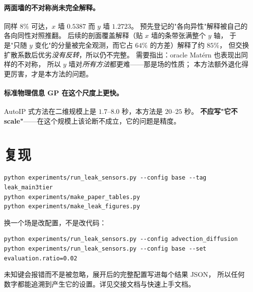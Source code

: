 \documentclass[11pt,a4paper]{article}
\begin{document}
\paragraph{两面墙的不对称尚未完全解释。}
同样 $8\%$ 可达，$x$ 墙 $0.5387$ 而 $y$ 墙 $1.2723$。
预先登记的"各向异性"解释被自己的各向同性对照推翻。
后续的剖面覆盖解释（贴 $x$ 墙的条带张满整个 $y$ 轴，
于是"只随 $y$ 变化"的分量被完全观测，而它占 $64\%$ 的方差）解释了约 $85\%$，
但交换扩散系数后优劣\emph{没有反转}，所以仍不完整。
需要指出：oracle Matérn 也表现出同样的不对称，
所以 $y$ 墙对\emph{所有方法}都更难——那是场的性质；
本方法额外退化得更厉害，才是本方法的问题。

\paragraph{标准物理信息 GP 在这个尺度上更快。}
AutoIP 式方法在二维规模上是 $1.7$--$8.0$ 秒，本方法是 $20$--$25$ 秒。
\textbf{不应写"它不 scale"}——在这个规模上该论断不成立，它的问题是精度。

\section{复现}

\begin{verbatim}
python experiments/run_leak_sensors.py --config base --tag leak_main3tier
python experiments/make_paper_tables.py
python experiments/make_leak_figures.py
\end{verbatim}

换一个场是改配置，不是改代码：

\begin{verbatim}
python experiments/run_leak_sensors.py --config advection_diffusion
python experiments/run_leak_sensors.py --config base --set evaluation.ratio=0.02
\end{verbatim}

未知键会报错而不是被忽略，展开后的完整配置写进每个结果 JSON，
所以任何数字都能追溯到产生它的设置。详见交接文档与快速上手文档。
\end{document}
